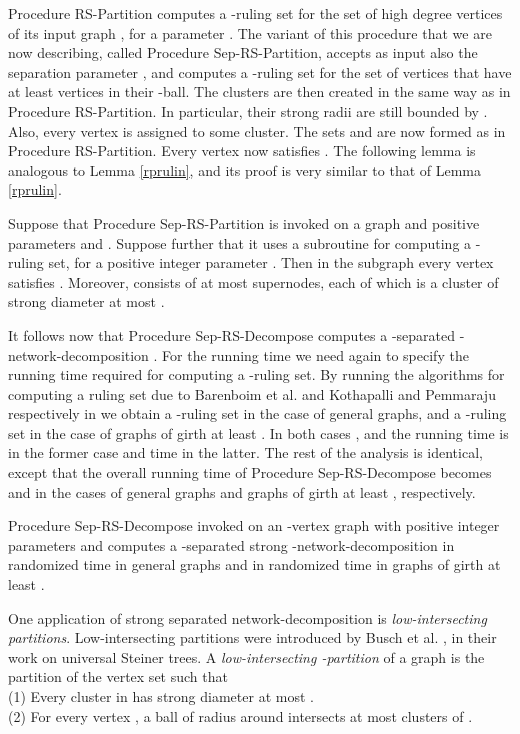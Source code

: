 \documentclass[11pt]{article}
\begin{document}
Procedure RS-Partition computes a -ruling set  for the set  of high degree vertices of its input graph , for a parameter . The variant of this procedure that we are now describing, called Procedure Sep-RS-Partition, accepts as input also the separation parameter , and computes a -ruling set  for the set  of vertices that have at least  vertices in their -ball. The clusters  are then created in the same way as in Procedure RS-Partition. In particular, their strong radii are still bounded by . Also, every vertex  is assigned to some cluster. The sets  and  are now formed as in Procedure RS-Partition. Every vertex  now satisfies . The following lemma is analogous to Lemma \ref{rprulin}, and its proof is very similar to that of Lemma \ref{rprulin}.
\begin{lem} \label{rpinv}
Suppose that Procedure Sep-RS-Partition is invoked on a graph  and positive parameters  and . Suppose further that it uses a subroutine for computing a -ruling set, for a positive integer parameter . Then in the subgraph  every vertex  satisfies . Moreover,  consists of at most  supernodes, each of which is a cluster of strong diameter at most .
\end{lem}
It follows now that Procedure Sep-RS-Decompose computes a -separated -network-decomposition . For the running time we need again to specify the running time required for computing a -ruling set. By running the algorithms for computing a ruling set due to Barenboim et al. \cite{BEPS12} and Kothapalli and Pemmaraju \cite{KP12} respectively in  we obtain a -ruling set in the case of general graphs, and a -ruling set in the case of graphs of girth at least . In both cases , and the running time is  in the former case and  time in the latter.
The rest of the analysis is identical, except that the overall running time of Procedure Sep-RS-Decompose becomes  and  in the cases of general graphs and graphs of girth at least , respectively.
\begin{thm}
Procedure Sep-RS-Decompose invoked on an -vertex graph  with positive integer parameters  and  computes a -separated strong -network-decomposition  in randomized time  in general graphs and in  randomized time in graphs of girth at least .
\end{thm}
One application of strong separated network-decomposition is {\em low-intersecting partitions}. Low-intersecting partitions were introduced by Busch et al. \cite{BDRRS12}, in their work on universal Steiner trees. A {\em low-intersecting -partition}  of a graph  is the partition of the vertex set  such that \\
(1) Every cluster  in  has strong diameter at most . \\
(2) For every vertex , a ball  of radius  around  intersects at most  clusters of .\\
\end{document}

